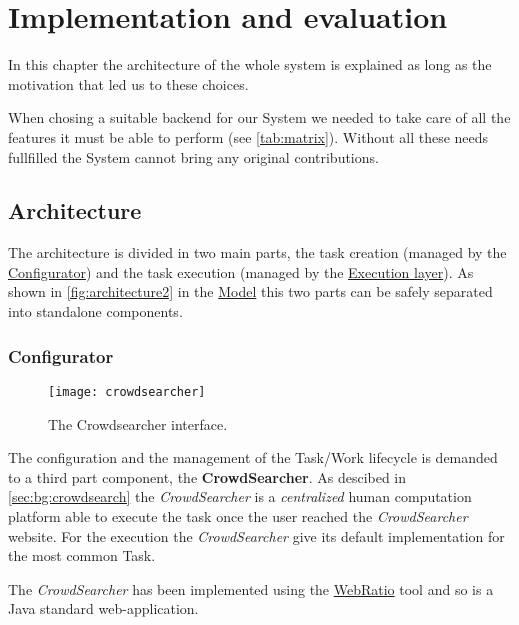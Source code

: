 \chapter{Implementation and evaluation}
\label{cap:implementation}

In this chapter the architecture of the whole system is explained as long as
the motivation that led us to these choices.

When chosing a suitable backend for our System we needed to take care of all the
features it must be able to perform (see \autoref{tab:matrix}). Without all these
needs fullfilled the System cannot bring any original contributions.

\section{Architecture}
\label{sec:implementation:arch}

The architecture is divided in two main parts, the task creation (managed by
the \hyperref[sec:configurator]{Configurator}) and the task execution (managed by
the \hyperref[sec:exec-layer]{Execution layer}).
As shown in \autoref{fig:architecture2} in the \hyperref[cap:model]{Model}
this two parts can be safely separated into standalone components.

\subsection{Configurator}
\begin{figure}[htb]
    \centering
    \texttt{[image: crowdsearcher]}
    \caption{The Crowdsearcher interface.}
    \label{fig:crowdsearcher}
\end{figure}
The configuration and the management of the Task/Work lifecycle is demanded to a
third part component, the \textbf{CrowdSearcher}. As descibed in
\ref{sec:bg:crowdsearch} the \emph{CrowdSearcher} is a \emph{centralized} human
computation platform able to execute the task once the user reached the
\emph{CrowdSearcher} website. For the execution the \emph{CrowdSearcher} give its
default implementation for the most common Task.

The \emph{CrowdSearcher} has been implemented using the
\href{http://www.webratio.com}{WebRatio} tool and so is a Java standard
web-application.


